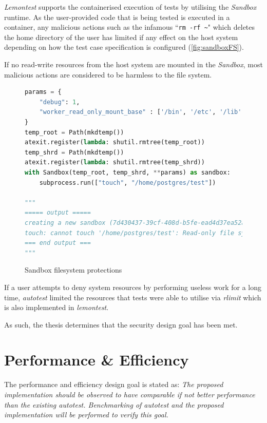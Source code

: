 \documentclass[hidelinks]{report}
\begin{document}
\textit{Lemontest} supports the containerised execution of tests by utilising the \textit{Sandbox} runtime. As the user-provided code that is being tested is executed in a container, any malicious actions such as the infamous ``\lstinline|rm -rf ~|" which deletes the home directory of the user has limited if any effect on the host system depending on how the test case specification is configured (\autoref{fig:sandboxFS}).

If no read-write resources from the host system are mounted in the \textit{Sandbox}, most malicious actions are considered to be harmless to the file system.
\begin{figure}[h]
	\centering
	\begin{lstlisting}[language=python, breaklines=true, linewidth=\linewidth, tabsize=4]
params = {
    "debug": 1,
    "worker_read_only_mount_base" : ['/bin', '/etc', '/lib', '/lib32', '/lib64', '/libx32', '/sbin', '/usr', '/home']
}
temp_root = Path(mkdtemp())
atexit.register(lambda: shutil.rmtree(temp_root))
temp_shrd = Path(mkdtemp())
atexit.register(lambda: shutil.rmtree(temp_shrd))
with Sandbox(temp_root, temp_shrd, **params) as sandbox:
    subprocess.run(["touch", "/home/postgres/test"])

"""
===== output =====
creating a new sandbox (7d430437-39cf-408d-b5fe-ead4d37ea52a)
touch: cannot touch '/home/postgres/test': Read-only file system
=== end output ===
"""
	\end{lstlisting}
	\caption{Sandbox filesystem protections}
	\label{fig:sandboxFS}
\end{figure}

If a user attempts to deny system resources by performing useless work for a long time, \textit{autotest} limited the resources that tests were able to utilise via \textit{rlimit} which is also implemented in \textit{lemontest}.

As such, the thesis determines that the security design goal has been met.

\clearpage
\section{Performance \& Efficiency}
The performance and efficiency design goal is stated as: \textit{The proposed implementation should be observed to have comparable if not better performance than the existing autotest. Benchmarking of autotest and the proposed implementation will be performed to verify this goal.}
\end{document}
